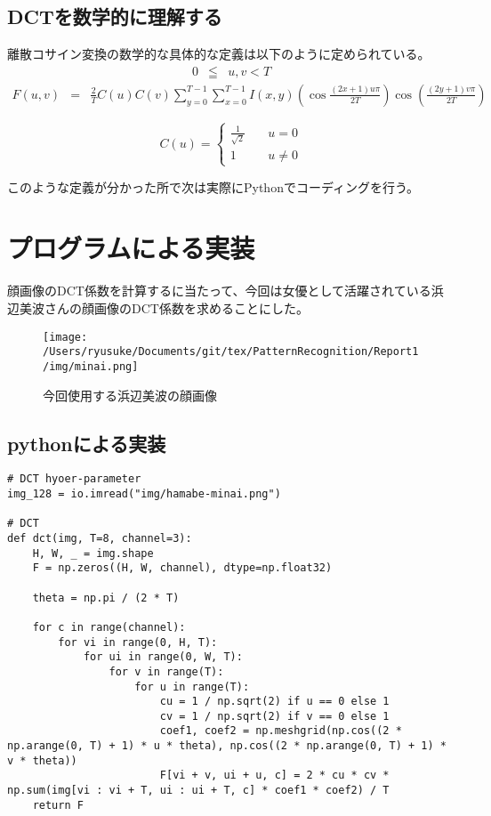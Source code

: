 \documentclass[dvipdfmx,uplatex]{jsarticle}
\begin{document}
\begin{spacing}{1.4}
\subsection{DCTを数学的に理解する}
離散コサイン変換の数学的な具体的な定義は以下のように定められている。\\
\begin{eqnarray*}
0 &\leqq& u, v < T
\end{eqnarray*}
\begin{eqnarray}
F(u, v) &=& \frac{2}{T}C(u)C(v)\sum_{y=0}^{T-1}\sum_{x=0}^{T-1}I(x, y)(\cos\frac{(2x + 1)u\pi}{2T})\cos(\frac{(2y + 1)v\pi}{2T})
\end{eqnarray}

\[\displaystyle
C(u) =
\begin{cases}
\frac{1}{\sqrt{2}} & \quad u = 0 \\
1 & \quad u \neq 0
\end{cases}
\]

このような定義が分かった所で次は実際にPythonでコーディングを行う。

\newpage

\section{プログラムによる実装}
顔画像のDCT係数を計算するに当たって、今回は女優として活躍されている浜辺美波さんの顔画像のDCT係数を求めることにした。

\begin{figure}[htbp]
\begin{center}
\texttt{[image: /Users/ryusuke/Documents/git/tex/PatternRecognition/Report1/img/minai.png]}
\caption{今回使用する浜辺美波の顔画像}
\end{center}
\end{figure}

\subsection{pythonによる実装}

\begin{lstlisting}[caption=DCT係数を求めるソースコード]
# DCT hyoer-parameter
img_128 = io.imread("img/hamabe-minai.png")

# DCT
def dct(img, T=8, channel=3):
    H, W, _ = img.shape
    F = np.zeros((H, W, channel), dtype=np.float32)

    theta = np.pi / (2 * T)

    for c in range(channel):
        for vi in range(0, H, T):
            for ui in range(0, W, T):
                for v in range(T):
                    for u in range(T):
                        cu = 1 / np.sqrt(2) if u == 0 else 1
                        cv = 1 / np.sqrt(2) if v == 0 else 1
                        coef1, coef2 = np.meshgrid(np.cos((2 * np.arange(0, T) + 1) * u * theta), np.cos((2 * np.arange(0, T) + 1) * v * theta))
                        F[vi + v, ui + u, c] = 2 * cu * cv * np.sum(img[vi : vi + T, ui : ui + T, c] * coef1 * coef2) / T
    return F


\end{lstlisting}
\end{spacing}
\end{document}
